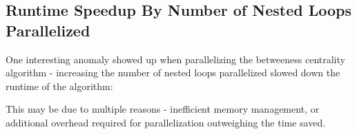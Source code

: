 \documentclass[12pt]{article}
\begin{document}
\subsection{Runtime Speedup By Number of Nested Loops Parallelized}

One interesting anomaly showed up when parallelizing the betweeness centrality algorithm - increasing the number of nested loops parallelized slowed down the runtime of the algorithm:


This may be due to multiple reasons - inefficient memory management, or additional overhead required for parallelization outweighing the time saved.
\end{document}
